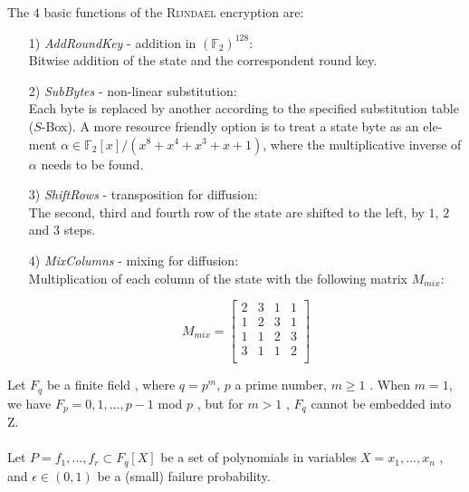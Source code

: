 \documentclass[a4paper,11pt]{article}
\begin{document}
\begin{otherlanguage}{english}
The $4$ basic functions of the \textsc{Rijndael} encryption are: \\

\begin{itemize} [noitemsep, nolistsep]
  \item[1)] \textit{AddRoundKey} - addition in ${(\mathbb{F}_2)}^{128}$: \\ 
  Bitwise addition of the state and the correspondent round key.
  \vspace{0.1cm}

  \item[2)] \textit{SubBytes} - non-linear substitution: \\
  Each byte is replaced by another according to the specified substitution table ($S$-Box). A more resource friendly option is to treat a state byte as an element $\alpha \in \mathbb{F}_2 [x]/(x^8 + x^4 + x^3 + x + 1)$, where the multiplicative inverse of $\alpha$ needs to be found.
  \vspace{0.1cm}

  \item[3)] \textit{ShiftRows} - transposition for diffusion: \\
  The second, third and fourth row of the state are shifted to the left, by $1$, $2$ and $3$ steps.
  \vspace{0.1cm}

  \item[4)] \textit{MixColumns} - mixing for diffusion: \\
  Multiplication of each column of the state with the following matrix $M_{mix}$:

  $$ 
  	M_{mix} = 
  	\begin{bmatrix}
  		2 & 3 & 1 & 1 \\ 
  	 	1 & 2 & 3 & 1 \\
  	 	1 & 1 & 2 & 3 \\
  	 	3 & 1 & 1 & 2 \\
  	\end{bmatrix}
  $$


\end{itemize} 



\vspace{1.0cm}

\noindent Let  $ F_q $ be a finite field , where $ q = p^m $, $p$ a prime number, $ m \ge 1 $ .
When $ m=1 $, we have $ F_p = {0,1,...,p-1} $ mod $p$ , but for $ m > 1 $ , $ F_q $ 
cannot be embedded into Z. \\ \\
Let $ P = { f_1,...,f_r} \subset F_q[X] $ be a set of polynomials in variables
$ X = { x_1,...,x_n } $ , and $ \epsilon \in (0,1) $ be a (small) failure probability. \\ \\


\end{otherlanguage}
\end{document}
